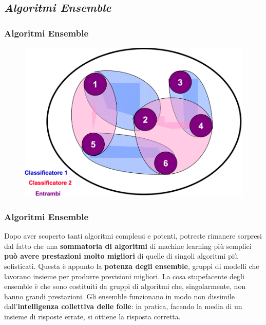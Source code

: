 \subsection[Algoritmi Ensemble]{\textit{Algoritmi Ensemble}}


\begin{frame}
	
	\frametitle{Algoritmi Ensemble}
	
	\begin{figure}[!htbp]
		\centering
		\includegraphics[width=0.90\linewidth]{images/supervised/z_algorithms_ensemble/ensemble.png}
	\end{figure}
	 
\end{frame}

\begin{frame}
	
	\frametitle{Algoritmi Ensemble}
	
	Dopo aver scoperto tanti algoritmi complessi e potenti, potreste rimanere sorpresi dal fatto che una \textbf{sommatoria di algoritmi} di machine learning più semplici \textbf{può avere prestazioni molto migliori} di quelle di singoli algoritmi più sofisticati.
	\newlinedouble
	Questa è appunto la \textbf{potenza degli ensemble}, gruppi di modelli che lavorano insieme per produrre previsioni migliori. La cosa stupefacente degli ensemble è che sono costituiti da gruppi di algoritmi che, singolarmente, non hanno grandi prestazioni.
	\newlinedouble
	Gli ensemble funzionano in modo non dissimile dall'\textbf{intelligenza collettiva delle folle}: in pratica, facendo la media di un insieme di risposte errate, si ottiene la risposta corretta.
	

\end{frame}


